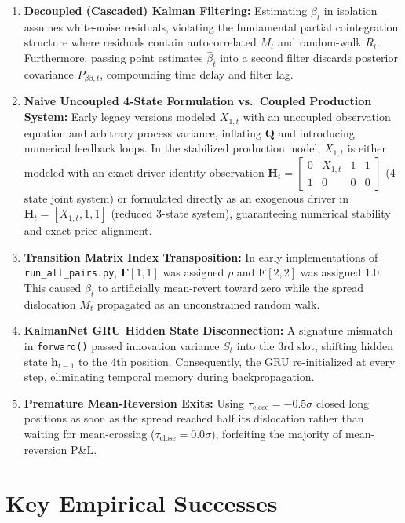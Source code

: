 \documentclass[11pt, a4paper]{article}
\begin{document}
\begin{enumerate}
    \item \textbf{Decoupled (Cascaded) Kalman Filtering:} Estimating $\beta_t$ in isolation assumes white-noise residuals, violating the fundamental partial cointegration structure where residuals contain autocorrelated $M_t$ and random-walk $R_t$. Furthermore, passing point estimates $\hat{\beta}_t$ into a second filter discards posterior covariance $P_{\beta\beta, t}$, compounding time delay and filter lag.
    \item \textbf{Naive Uncoupled 4-State Formulation vs.\ Coupled Production System:} Early legacy versions modeled $X_{1,t}$ with an uncoupled observation equation and arbitrary process variance, inflating $\mathbf{Q}$ and introducing numerical feedback loops. In the stabilized production model, $X_{1,t}$ is either modeled with an exact driver identity observation $\mathbf{H}_t = \begin{bmatrix} 0 & X_{1,t} & 1 & 1 \\ 1 & 0 & 0 & 0 \end{bmatrix}$ (4-state joint system) or formulated directly as an exogenous driver in $\mathbf{H}_t = [X_{1,t}, 1, 1]$ (reduced 3-state system), guaranteeing numerical stability and exact price alignment.
    \item \textbf{Transition Matrix Index Transposition:} In early implementations of \texttt{run\_all\_pairs.py}, $\mathbf{F}[1,1]$ was assigned $\rho$ and $\mathbf{F}[2,2]$ was assigned $1.0$. This caused $\beta_t$ to artificially mean-revert toward zero while the spread dislocation $M_t$ propagated as an unconstrained random walk.
    \item \textbf{KalmanNet GRU Hidden State Disconnection:} A signature mismatch in \texttt{forward()} passed innovation variance $S_t$ into the 3rd slot, shifting hidden state $\mathbf{h}_{t-1}$ to the 4th position. Consequently, the GRU re-initialized at every step, eliminating temporal memory during backpropagation.
    \item \textbf{Premature Mean-Reversion Exits:} Using $\tau_{\text{close}} = -0.5\sigma$ closed long positions as soon as the spread reached half its dislocation rather than waiting for mean-crossing ($\tau_{\text{close}} = 0.0\sigma$), forfeiting the majority of mean-reversion P\&L.
\end{enumerate}

\section{Key Empirical Successes}
\end{document}

